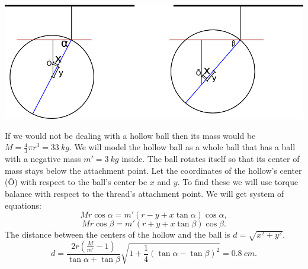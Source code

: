 \documentclass[11pt]{article}
\begin{document}
\solueng
\begin{center}
\includegraphics[width=\textwidth]{2013-v2g-09-kera}
\end{center}
If we would not be dealing with a hollow ball then its mass would be $M=\frac{4}{3}\pi r^3 = \SI{33}{kg}$. We will model the hollow ball as a whole ball that has a ball with a negative mass $m'=\SI{3}{kg}$ inside. The ball rotates itself so that its center of mass stays below the attachment point. Let the coordinates of the hollow’s center (Õ) with respect to the ball’s center be $x$ and $y$. To find these we will use torque balance with respect to the thread’s attachment point. We will get system of equations:
\[Mr \cos \alpha = m'(r-y+x \tan \alpha) \cos \alpha,\] 
\[Mr \cos \beta = m'(r+y+x \tan \beta) \cos \beta.\]
The distance between the centers of the hollow and the ball is $d=\sqrt{x^2+y^2}$.
\[ d=\frac{2r(\frac{M}{m'}-1)}{\tan\alpha+\tan\beta}\sqrt{1+\frac{1}{4}(\tan\alpha-\tan\beta)^2} = \SI{0,8}{cm}. \]
\probend
\bigskip

\end{document}
